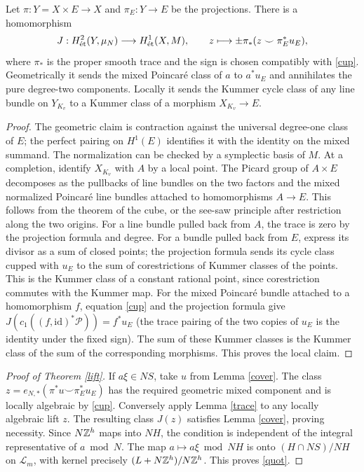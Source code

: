 \documentclass[11pt,a4paper]{article}
\theoremstyle{remark}\newtheorem{remark}[theorem]{Remark}
\begin{document}
\begin{lemma}\label{trace}
Let $\pi:Y=X\times E\to X$ and $\pi_E:Y\to E$ be the projections. There is a homomorphism
\[
 J:H^2_{\mathrm{\acute et}}(Y,\mu_N)\longrightarrow H^1_{\mathrm{\acute et}}(X,M),\qquad
 z\longmapsto\pm\pi_*(z\smile\pi_E^*u_E),
\]
where $\pi_*$ is the proper smooth trace and the sign is chosen compatibly with \eqref{cup}. Geometrically it sends the mixed Poincar\'e class of $a$ to $a^*u_E$ and annihilates the pure degree-two components. Locally it sends the Kummer cycle class of any line bundle on $Y_{K_v}$ to a Kummer class of a morphism $X_{K_v}\to E$.
\end{lemma}
\begin{proof}
The geometric claim is contraction against the universal degree-one class of $E$; the perfect pairing on $H^1(E)$ identifies it with the identity on the mixed summand. The normalization can be checked by a symplectic basis of $M$. At a completion, identify $X_{K_v}$ with $A$ by a local point. The Picard group of $A\times E$ decomposes as the pullbacks of line bundles on the two factors and the mixed normalized Poincar\'e line bundles attached to homomorphisms $A\to E$. This follows from the theorem of the cube, or the see-saw principle after restriction along the two origins. For a line bundle pulled back from $A$, the trace is zero by the projection formula and degree. For a bundle pulled back from $E$, express its divisor as a sum of closed points; the projection formula sends its cycle class cupped with $u_E$ to the sum of corestrictions of Kummer classes of the points. This is the Kummer class of a constant rational point, since corestriction commutes with the Kummer map. For the mixed Poincar\'e bundle attached to a homomorphism $f$, equation \eqref{cup} and the projection formula give $J(c_1((f,\mathrm{id})^*\mathcal P))=f^*u_E$ (the trace pairing of the two copies of $u_E$ is the identity under the fixed sign). The sum of these Kummer classes is the Kummer class of the sum of the corresponding morphisms. This proves the local claim.
\end{proof}
\begin{proof}[Proof of Theorem \ref{lift}]
If $a\xi\in N S$, take $u$ from Lemma \ref{cover}. The class $z=e_{N,*}(\pi^*u\smile\pi_E^*u_E)$ has the required geometric mixed component and is locally algebraic by \eqref{cup}. Conversely apply Lemma \ref{trace} to any locally algebraic lift $z$. The resulting class $J(z)$ satisfies Lemma \ref{cover}, proving necessity. Since $N\mathbb Z^h$ maps into $NH$, the condition is independent of the integral representative of $a\bmod N$. The map $a\mapsto a\xi\bmod NH$ is onto $(H\cap N S)/NH$ on $\mathcal L_m$, with kernel precisely $(L+N\mathbb Z^h)/N\mathbb Z^h$. This proves \eqref{quot}.
\end{proof}
\end{document}
